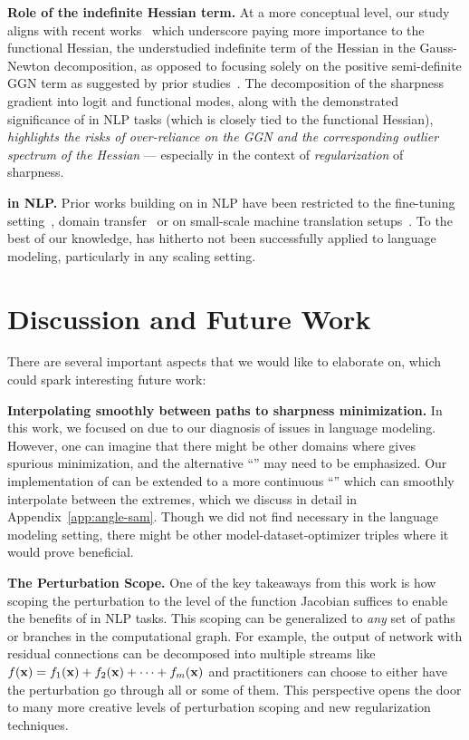 \textbf{Role of the indefinite Hessian term.} At a more conceptual level, our study aligns with recent works~\citep{singh2021analytic,dauphin2024neglected} which underscore paying more importance to the functional Hessian, the understudied indefinite term of the Hessian in the Gauss-Newton decomposition, as opposed to focusing solely on the positive semi-definite GGN term as suggested by prior studies~\citep{sagun2018empiricalanalysishessianoverparametrized,papyan2019spectrumdeepnethessiansscale,jacot2020asymptoticspectrumhessiandnn}. The decomposition of the sharpness gradient into logit and functional modes, along with the demonstrated significance of \funcSAM in NLP tasks (which is closely tied to the functional Hessian),\textit{ highlights the risks of over-reliance on the GGN and the corresponding outlier spectrum of the Hessian} --- 
especially in the context of \emph{regularization} of sharpness.

\textbf{\SAM in NLP.} Prior works building on \SAM in NLP have been restricted to the fine-tuning setting~\citep{bahri2022sharpnessawareminimizationimproveslanguage}, domain transfer~\citep{sherborne2024trambridgingtrustregions} or on small-scale machine translation setups~\citep{li2024enhancing}.
To the best of our knowledge, \SAM has hitherto not been successfully applied to language modeling, particularly in any scaling
setting.


\section{Discussion and Future Work}\label{sec:disc}
There are several important aspects that we would like to elaborate on, which could spark interesting future work:

\textbf{Interpolating smoothly between paths to sharpness minimization.} In this work, we focused on \funcSAM due
to our diagnosis of issues in language modeling. However, one can imagine that there might be other domains where \funcSAM gives
spurious minimization, and the alternative ``\logitSAM'' may need to be emphasized. Our implementation of \funcSAM can be extended
to a more continuous ``\angleSAM'' which can smoothly interpolate between the extremes, which we discuss in detail in Appendix~\ref{app:angle-sam}. Though we did not
find \angleSAM necessary in the language modeling setting, there might be other model-dataset-optimizer triples where it would prove beneficial.




\textbf{The Perturbation Scope.} One of the key takeaways from this work is how scoping the perturbation to the level of the function Jacobian suffices to enable the benefits of \SAM in NLP tasks.
This scoping can be generalized to \emph{any}
set of paths or branches in the computational graph. For example, the output of network with residual connections can be decomposed into multiple streams like $f(\mathbf x) = f_1(\mathbf x) + f_2(\mathbf x) + \cdots + f_m(\mathbf x)$ and
practitioners can choose to either have the perturbation go through all or some of them. This perspective opens the door to many more creative levels of perturbation scoping and new regularization techniques.


